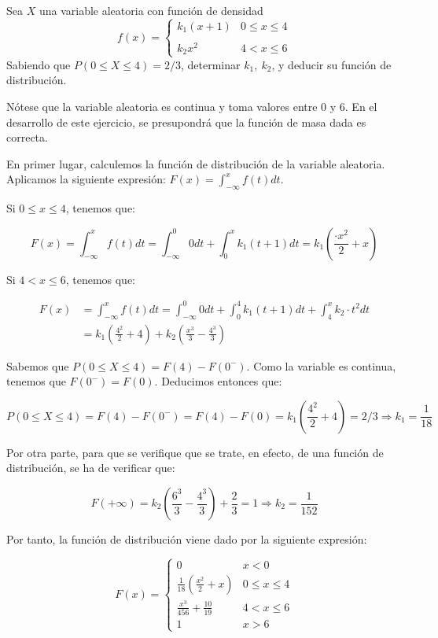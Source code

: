 \problem
Sea $X$ una variable aleatoria con funci{\'o}n de densidad
$$
f(x) = \left \{
\begin{array}{lc}
k_{1} (x+1) & 0 \leq x \leq 4 \\
\\ k_{2} x^{2} & 4 <x \leq 6
\end{array}
\right.
$$
Sabiendo que  $P(0 \leq X \leq 4) = 2/3$,  determinar $k_{1},\ k_{2}$, y
deducir su funci{\'o}n de distribuci{\'o}n.

Nótese que la variable aleatoria es continua y toma valores entre 0 y 6. En el desarrollo de este ejercicio, se presupondrá que la función de masa dada es correcta. 

En primer lugar, calculemos la función de distribución de la variable aleatoria. Aplicamos la siguiente expresión: $F(x) = \int_{-\infty}^x f(t) dt$. 

Si $0 \leq x \leq 4$, tenemos que: 

$$F(x) = \int_{-\infty}^x f(t) dt = \int_{-\infty}^0 0 dt + \int_0^x k_1(t+1)dt = k_1(\frac{·x^2}{2} + x)$$ 

Si $4 < x \leq 6$, tenemos que:

\begin{equation*}
\begin{split}
F(x) & = \int_{-\infty}^x f(t) dt = \int_{-\infty}^0 0 dt + \int_0^4 k_1(t+1)dt + \int_4^x k_2·t^2 dt \\
& = k_1(\frac{4^2}{2} + 4) + k_2(\frac{x^3}{3} - \frac{4^3}{3}) 
\end{split}
\end{equation*}

Sabemos que $P(0\leq X \leq 4) = F(4) - F(0^-)$. Como la variable es continua, tenemos que $F(0^-) = F(0)$. Deducimos entonces que: 

$$P(0 \leq X \leq 4) = F(4) - F(0^-) = F(4) - F(0) = k_1(\frac{4^2}{2} + 4) = 2/3 \Rightarrow k_1 = \frac{1}{18}$$

Por otra parte, para que se verifique que se trate, en efecto, de una función de distribución, se ha de verificar que: 

$$F(+\infty) = k_2(\frac{6^3}{3} - \frac{4^3}{3}) + \frac{2}{3} = 1 \Rightarrow k_2 = \frac{1}{152}$$

Por tanto, la función de distribución viene dado por la siguiente expresión: 

\begin{equation*}
	F(x) = \left \{
	\begin{array}{lcc}
	0 & x < 0 \\
	\frac{1}{18}(\frac{x^2}{2} + x) & 0 \leq x \leq 4 \\
	\frac{x^3}{456} + \frac{10}{19} & 4 <x \leq 6 \\
	1 & x > 6
	\end{array}
	\right.
\end{equation*}
